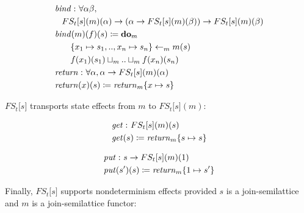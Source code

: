 \small\begin{align*}
&\hspace{0em}  \operatorname{\mathit{bind}}   \mathbin{\colon}   \forall   \alpha   \beta ,  \\
&\hspace{1em} FS _t  \lbrack s \rbrack (m)( \alpha )  \rightarrow  ( \alpha   \rightarrow  FS _t  \lbrack s \rbrack (m)( \beta ))  \rightarrow  FS _t  \lbrack s \rbrack (m)( \beta ) \\
&\hspace{0em}  \operatorname{\mathit{bind}}( m)(f)(s)  \coloneqq   \operatorname{\mathtt{\boldsymbol{\mathbf{do}}}} _m   \\
&\hspace{2em}  \{ x _1   \mapsto  s _1 ,..,x _n   \mapsto  s _n  \}   \leftarrow  _m  m(s) \\
&\hspace{2em} f(x _1 )(s _1 )  \sqcup  _m  ..  \sqcup  _m  f(x _n )(s _n ) \\
&\hspace{0em}  \operatorname{\mathit{return}}   \mathbin{\colon}   \forall   \alpha ,  \alpha   \rightarrow  FS _t  \lbrack s \rbrack (m)( \alpha ) \\
&\hspace{0em}  \operatorname{\mathit{return}}( x)(s)  \coloneqq   \operatorname{\mathit{return}} _m    \{ x  \mapsto  s \} 
\end{align*}\normalsize

$FS _t  \lbrack s \rbrack $ transports state effects from $m$ to
$FS _t  \lbrack s \rbrack (m)$:

\small\begin{align*}
&\hspace{0em}  \operatorname{\mathit{get}}   \mathbin{\colon}  FS _t  \lbrack s \rbrack (m)(s) \\
&\hspace{0em}  \operatorname{\mathit{get}}( s)  \coloneqq   \operatorname{\mathit{return}} _m    \{ s  \mapsto  s \} 
\end{align*}\normalsize

\small\begin{align*}
&\hspace{0em}  \operatorname{\mathit{put}}   \mathbin{\colon}  s  \rightarrow  FS _t  \lbrack s \rbrack (m)(1) \\
&\hspace{0em}  \operatorname{\mathit{put}}( s')(s)  \coloneqq   \operatorname{\mathit{return}} _m    \{ 1  \mapsto  s' \} 
\end{align*}\normalsize

Finally, $FS _t  \lbrack s \rbrack $ supports nondeterminism effects
provided $s$ is a join-semilattice and $m$ is a join-semilattice
functor:

